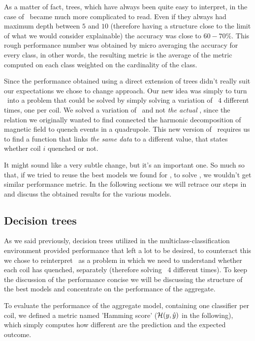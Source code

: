 As a matter of fact, trees, which have always been quite easy to interpret, in the case of \qlp\
became much more complicated to read. Even if they always had maximum depth between $5$ and $10$
(therefore having a structure close to the limit of what we would consider explainable) the accuracy
was close to $60 - 70\%$. This rough performance number was obtained by micro averaging the accuracy
for every class, in other words, the resulting metric is the average of the metric computed on each
class weighted on the cardinality of the class.

Since the performance obtained using a direct extension of trees didn't really suit our expectations
we chose to change approach. Our new idea was simply to turn \qlp\ into a problem that could be
solved by simply solving a variation of \qrp\ $4$ different times, one per coil. We solved a
variation of \qrp\ and not \emph{the actual} \qrp, since the relation we originally wanted to find
connected the harmonic decomposition of magnetic field to quench events in a quadrupole. This new
version of \qrp\ requires us to find a function that links \emph{the same data} to a different
value, that states whether coil $i$ quenched or not.

It might sound like a very subtle change, but it's an important one. So much so that, if we tried to
reuse the best models we found for \qrp, to solve \qlp, we wouldn't get similar performance metric.
In the following sections we will retrace our steps in \Cref{chp:qrp} and discuss the obtained
results for the various models.

\subsection{Decision trees}
As we said previously, decision trees utilized in the multiclass-classification environment provided
performance that left a lot to be desired, to counteract this we chose to reinterpret \qlp\ as a
problem in which we need to understand whether each coil has quenched, separately (therefore
solving \qrp\ $4$ different times). To keep the discussion of the performance concise we will be
discussing the structure of the best models and concentrate on the performance of the aggregate.

To evaluate the performance of the aggregate model, containing one classifier per coil, we defined a
metric named 'Hamming score' ($\mathcal{H}(y, \hat{y})$ in the following), which simply computes how different are the
prediction and the expected outcome.

